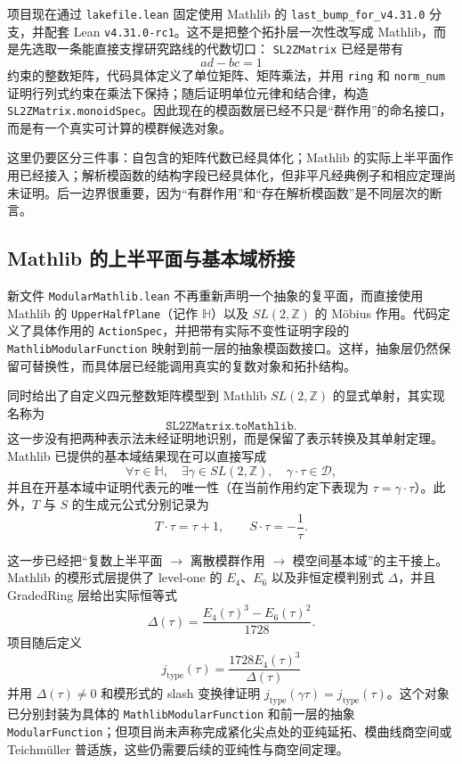 \documentclass[UTF8,fontset=none,a4paper,11pt]{ctexart}
\begin{document}
项目现在通过 \texttt{lakefile.lean} 固定使用 Mathlib 的
\texttt{last\_bump\_for\_v4.31.0} 分支，并配套 Lean
\texttt{v4.31.0-rc1}。这不是把整个拓扑层一次性改写成 Mathlib，而是先选取一条能直接支撑研究路线的代数切口：
\texttt{SL2ZMatrix} 已经是带有
\[
  ad-bc=1
\]
约束的整数矩阵，代码具体定义了单位矩阵、矩阵乘法，并用 \texttt{ring} 和
\texttt{norm\_num} 证明行列式约束在乘法下保持；随后证明单位元律和结合律，构造
\texttt{SL2ZMatrix.monoidSpec}。因此现在的模函数层已经不只是“群作用”的命名接口，而是有一个真实可计算的模群候选对象。

这里仍要区分三件事：自包含的矩阵代数已经具体化；Mathlib 的实际上半平面作用已经接入；解析模函数的结构字段已经具体化，但非平凡经典例子和相应定理尚未证明。后一边界很重要，因为“有群作用”和“存在解析模函数”是不同层次的断言。

\subsection{Mathlib 的上半平面与基本域桥接}

新文件 \texttt{ModularMathlib.lean} 不再重新声明一个抽象的复平面，而直接使用 Mathlib 的
\texttt{UpperHalfPlane}（记作 \(\mathbb H\)）以及 \(SL(2,\mathbb Z)\) 的 Möbius 作用。代码定义了具体作用的 \texttt{ActionSpec}，并把带有实际不变性证明字段的 \texttt{MathlibModularFunction} 映射到前一层的抽象模函数接口。这样，抽象层仍然保留可替换性，而具体层已经能调用真实的复数对象和拓扑结构。

同时给出了自定义四元整数矩阵模型到 Mathlib
\(SL(2,\mathbb Z)\) 的显式单射，其实现名称为
\[
\texttt{SL2ZMatrix.toMathlib}.
\]
这一步没有把两种表示法未经证明地识别，而是保留了表示转换及其单射定理。Mathlib 已提供的基本域结果现在可以直接写成
\[
  \forall\tau\in\mathbb H,\quad
  \exists\gamma\in SL(2,\mathbb Z),\quad
  \gamma\cdot\tau\in\mathcal D,
\]
并且在开基本域中证明代表元的唯一性（在当前作用约定下表现为 \(\tau=\gamma\cdot\tau\)）。此外，\(T\) 与 \(S\) 的生成元公式分别记录为
\[
  T\cdot\tau=\tau+1,\qquad
  S\cdot\tau=-\frac{1}{\tau}.
\]

这一步已经把“复数上半平面 \(\to\) 离散模群作用 \(\to\) 模空间基本域”的主干接上。Mathlib 的模形式层提供了 level-one 的 \(E_4\)、\(E_6\) 以及非恒定模判别式 \(\Delta\)，并且 GradedRing 层给出实际恒等式
\[
  \Delta(\tau)=\frac{E_4(\tau)^3-E_6(\tau)^2}{1728}.
\]
项目随后定义
\[
  j_{\mathrm{type}}(\tau)=\frac{1728E_4(\tau)^3}{\Delta(\tau)}
\]
并用 \(\Delta(\tau)\ne0\) 和模形式的 slash 变换律证明
\(j_{\mathrm{type}}(\gamma\tau)=j_{\mathrm{type}}(\tau)\)。这个对象已分别封装为具体的
\texttt{MathlibModularFunction} 和前一层的抽象 \texttt{ModularFunction}；但项目尚未声称完成紧化尖点处的亚纯延拓、模曲线商空间或 Teichmüller 普适族，这些仍需要后续的亚纯性与商空间定理。
\end{document}
